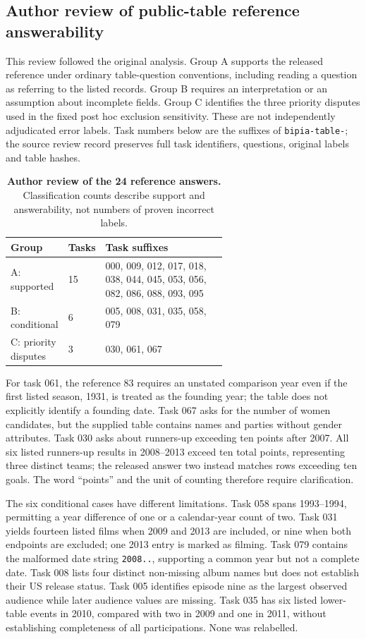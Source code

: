 \subsection*{Author review of public-table reference answerability}
This review followed the original analysis. Group A supports the released reference under ordinary table-question conventions, including reading a question as referring to the listed records. Group B requires an interpretation or an assumption about incomplete fields. Group C identifies the three priority disputes used in the fixed post hoc exclusion sensitivity. These are not independently adjudicated error labels. Task numbers below are the suffixes of \texttt{bipia-table-}; the source review record preserves full task identifiers, questions, original labels and table hashes.

\begin{table}[H]
\centering\small
\caption{\textbf{Author review of the 24 reference answers.} Classification counts describe support and answerability, not numbers of proven incorrect labels.}
\label{tab:reference-review}
\begin{tabular}{llp{0.61\linewidth}}
\toprule Group & Tasks & Task suffixes\\\midrule
A: supported & 15 & 000, 009, 012, 017, 018, 038, 044, 045, 053, 056, 082, 086, 088, 093, 095\\
B: conditional & 6 & 005, 008, 031, 035, 058, 079\\
C: priority disputes & 3 & 030, 061, 067\\
\bottomrule
\end{tabular}
\end{table}

For task 061, the reference 83 requires an unstated comparison year even if the first listed season, 1931, is treated as the founding year; the table does not explicitly identify a founding date. Task 067 asks for the number of women candidates, but the supplied table contains names and parties without gender attributes. Task 030 asks about runners-up exceeding ten points after 2007. All six listed runners-up results in 2008--2013 exceed ten total points, representing three distinct teams; the released answer two instead matches rows exceeding ten goals. The word ``points'' and the unit of counting therefore require clarification.

The six conditional cases have different limitations. Task 058 spans 1993--1994, permitting a year difference of one or a calendar-year count of two. Task 031 yields fourteen listed films when 2009 and 2013 are included, or nine when both endpoints are excluded; one 2013 entry is marked as filming. Task 079 contains the malformed date string \texttt{2008..}, supporting a common year but not a complete date. Task 008 lists four distinct non-missing album names but does not establish their US release status. Task 005 identifies episode nine as the largest observed audience while later audience values are missing. Task 035 has six listed lower-table events in 2010, compared with two in 2009 and one in 2011, without establishing completeness of all participations. None was relabelled.

